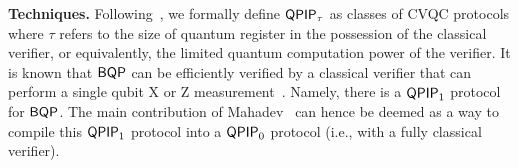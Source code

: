 %

\vspace{2mm} \noindent \textbf{Techniques.} Following~\cite{FOCS:Mahadev18a}, we formally define $\operatorname{\mathsf{QPIP}}_{\tau}$ as classes of CVQC protocols where $\tau$ refers to the size of quantum register in the possession of the classical verifier, or equivalently, the limited quantum computation power of the verifier.
It is known that $\operatorname{\mathsf{BQP}}$ can be efficiently verified by a classical verifier that can perform a single qubit X or Z measurement~\cite{PhysRevA.93.022326, mf16}.
Namely, there is a $\operatorname{\mathsf{QPIP}}_1$ protocol for $\operatorname{\mathsf{BQP}}$.
The main contribution of Mahadev~\cite{FOCS:Mahadev18a} can hence be deemed as a way to compile this $\operatorname{\mathsf{QPIP}}_1$ protocol into a $\operatorname{\mathsf{QPIP}}_0$ protocol (i.e., with a fully classical verifier).

